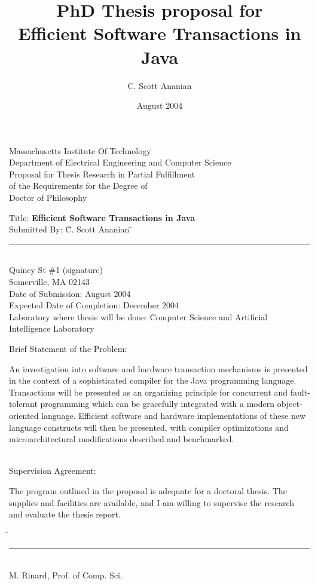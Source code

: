 \documentclass[12pt]{article}
\title{{\large PhD Thesis proposal for}\\
Efficient Software Transactions in Java}
\author{C. Scott Ananian}
\date{August 2004\\\vspace{5pt}}
\newcommand{\sis}{\linespread{1.0}\setlength{\baselineskip}{0.8\baselineskip}}
\begin{document}

\begin{titlepage}
\sis
\newcommand{\nl}{\\[0.4\baselineskip]}
\newcommand{\tight}{\\[-0.1\baselineskip]}
\newcommand{\tighter}{\\[-0.2\baselineskip]}
\begin{centering}\large
Massachusetts Institute Of Technology\tight
Department of Electrical Engineering and Computer Science\nl
%
Proposal for Thesis Research in Partial Fulfillment\tight
of the Requirements for the Degree of\tight
Doctor of Philosophy\nl
\end{centering}
\vspace{0.05cm}
\begin{tabbing}
Title: \textbf{Efficient Software Transactions in Java}\nl
Submitted By: \= C. Scott Ananian \hspace{3cm}\=\rule{6cm}{0.5pt}\tighter
               Quincy St \#1             \>(signature)\tighter
              \> Somerville, MA 02143\nl
Date of Submission: August 2004\tighter
Expected Date of Completion: December 2004\tighter
Laboratory where thesis will be done: \=Computer Science and Artificial\tighter
\>Intelligence Laboratory%
\end{tabbing}
Brief Statement of the Problem:

An investigation into software and hardware transaction mechanisms
is presented in the context of a sophisticated compiler for the Java
programming language.  Transactions will be presented as an organizing
principle for concurrent and fault-tolerant programming which can be
gracefully integrated with a modern object-oriented language.
Efficient software and hardware implementations of these new language
constructs will then be presented, with compiler optimizations and
microarchitectural modifications described and benchmarked.

~\\Supervision Agreement:

The program outlined in the proposal is adequate for a doctoral
thesis.  The supplies and facilities are available, and I am willing
to supervise the research and evaluate the thesis report.

\begin{tabbing}
\hspace{3.5in}\=\kill
\>\rule{2.5in}{0.5pt}\\
\>M. Rinard, Prof. of Comp. Sci.\\
\end{tabbing}

\end{titlepage}
\end{document}
